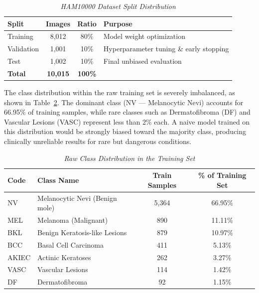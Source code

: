 \begin{table}[H]
	\centering
	\renewcommand{\arraystretch}{1.5}
	\begin{tabular}{|l|c|c|l|}
		\hline
		\rowcolor[HTML]{1F3864}
		{\color{white}\textbf{Split}} &
		{\color{white}\textbf{Images}} &
		{\color{white}\textbf{Ratio}} &
		{\color{white}\textbf{Purpose}} \\
		\hline
		Training   & 8,012 & 80\% & Model weight optimization \\
		\hline
		Validation & 1,001 & 10\% & Hyperparameter tuning \& early stopping \\
		\hline
		Test       & 1,002 & 10\% & Final unbiased evaluation \\
		\hline
		\textbf{Total} & \textbf{10,015} & \textbf{100\%} & \\
		\hline
	\end{tabular}
	\caption{\textit{HAM10000 Dataset Split Distribution}}
	\label{tab:dataset_split}
\end{table}

The class distribution within the raw training set is severely imbalanced, as shown
in Table~\ref{tab:class_dist}. The dominant class (NV --- Melanocytic Nevi) accounts
for 66.95\% of training samples, while rare classes such as Dermatofibroma (DF) and
Vascular Lesions (VASC) represent less than 2\% each. A naive model trained on this
distribution would be strongly biased toward the majority class, producing clinically
unreliable results for rare but dangerous conditions.

\begin{table}[H]
	\centering
	\renewcommand{\arraystretch}{1.5}
	\begin{tabular}{|l|l|c|c|}
		\hline
		\rowcolor[HTML]{1F3864}
		{\color{white}\textbf{Code}} &
		{\color{white}\textbf{Class Name}} &
		{\color{white}\textbf{Train Samples}} &
		{\color{white}\textbf{\% of Training Set}} \\
		\hline
		NV    & Melanocytic Nevi (Benign mole)      & 5,364 & 66.95\% \\
		\hline
		MEL   & Melanoma (Malignant)                &   890 & 11.11\% \\
		\hline
		BKL   & Benign Keratosis-like Lesions       &   879 & 10.97\% \\
		\hline
		BCC   & Basal Cell Carcinoma                &   411 &  5.13\% \\
		\hline
		AKIEC & Actinic Keratoses                   &   262 &  3.27\% \\
		\hline
		VASC  & Vascular Lesions                    &   114 &  1.42\% \\
		\hline
		DF    & Dermatofibroma                      &    92 &  1.15\% \\
		\hline
	\end{tabular}
	\caption{\textit{Raw Class Distribution in the Training Set}}
	\label{tab:class_dist}
\end{table}

